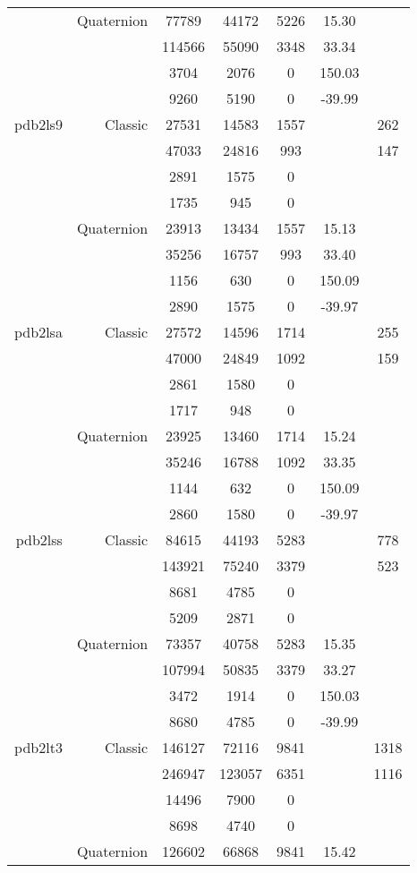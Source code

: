 \begin{xltabular}{\textwidth}{r|rcccSc}
& Quaternion & 77789 & 44172 & 5226 & 15.30 & \\
& & 114566 & 55090 & 3348 & 33.34 & \\
& & 3704 & 2076 & 0 & 150.03 & \\
& & 9260 & 5190 & 0 & -39.99 & \\ \addlinespace
pdb2ls9 & Classic & 27531 & 14583 & 1557 & & 262 \\
& & 47033 & 24816 & 993 & & 147 \\
& & 2891 & 1575 & 0 & & \\
& & 1735 & 945 & 0 & & \\
& Quaternion & 23913 & 13434 & 1557 & 15.13 & \\
& & 35256 & 16757 & 993 & 33.40 & \\
& & 1156 & 630 & 0 & 150.09 & \\
& & 2890 & 1575 & 0 & -39.97 & \\ \addlinespace
pdb2lsa & Classic & 27572 & 14596 & 1714 & & 255 \\
& & 47000 & 24849 & 1092 & & 159 \\
& & 2861 & 1580 & 0 & & \\
& & 1717 & 948 & 0 & & \\
& Quaternion & 23925 & 13460 & 1714 & 15.24 & \\
& & 35246 & 16788 & 1092 & 33.35 & \\
& & 1144 & 632 & 0 & 150.09 & \\
& & 2860 & 1580 & 0 & -39.97 & \\ \addlinespace
pdb2lss & Classic & 84615 & 44193 & 5283 & & 778 \\
& & 143921 & 75240 & 3379 & & 523 \\
& & 8681 & 4785 & 0 & & \\
& & 5209 & 2871 & 0 & & \\
& Quaternion & 73357 & 40758 & 5283 & 15.35 & \\
& & 107994 & 50835 & 3379 & 33.27 & \\
& & 3472 & 1914 & 0 & 150.03 & \\
& & 8680 & 4785 & 0 & -39.99 & \\ \addlinespace
pdb2lt3 & Classic & 146127 & 72116 & 9841 & & 1318 \\
& & 246947 & 123057 & 6351 & & 1116 \\
& & 14496 & 7900 & 0 & & \\
& & 8698 & 4740 & 0 & & \\
& Quaternion & 126602 & 66868 & 9841 & 15.42 & \\

\end{xltabular}
